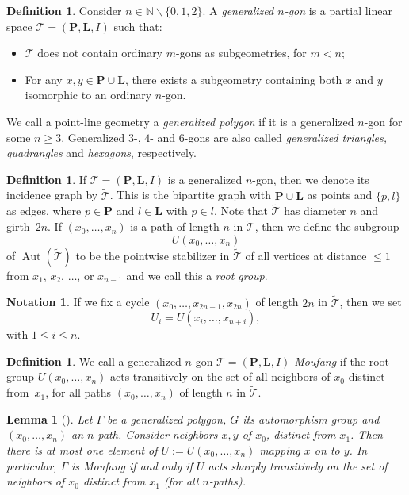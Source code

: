\documentclass[oneside,a4paper]{amsart} %
\newtheorem{lemma}[theorem]{Lemma}
\theoremstyle{definition}
\newtheorem{definition}[theorem]{Definition}
\newtheorem{notation}[theorem]{Notation}
\DeclareMathOperator{\Aut}{Aut}
\numberwithin{equation}{section}
\begin{document}
\begin{definition}
	Consider $n\in\mathbb N\backslash \{0,1,2\}$.
	A \textit{generalized $n$-gon} is a partial linear space $\mathcal T=(\mathbf P,\mathbf L,I)$ such that: 
	\begin{itemize}
		\item $\mathcal T$ does not contain ordinary $m$-gons as subgeometries, for $m<n$;
		\item For any $x,y\in\mathbf P\cup\mathbf L$, there exists a subgeometry containing both $x$ and $y$ isomorphic to an ordinary $n$-gon.
	\end{itemize}
	We call a point-line geometry a \textit{generalized polygon} if it is a generalized $n$-gon for some $n\geq 3$.
	Generalized $3$-, $4$- and $6$-gons are also called \textit{generalized triangles, quadrangles} and \textit{hexagons}, respectively.
\end{definition}

\begin{definition}
	If $\mathcal T=(\mathbf P,\mathbf L,I)$ is a generalized $n$-gon, then we denote its incidence graph by $\tilde{\mathcal T}$. 
	This is the bipartite graph with $\mathbf P\cup\mathbf L$ as points and $\{p,l\}$ as edges, where $p\in\mathbf P$ and $l\in\mathbf L$ with $p\in l$.
	Note that $\tilde{\mathcal T}$ has diameter $n$ and girth~$2n$.
	If $(x_0,\dots,x_n)$ is a path of length $n$ in $\tilde{\mathcal T}$, then we define the subgroup
		$$ U(x_0,\dots,x_n)$$
	of $\Aut(\tilde{\mathcal T})$ to be the pointwise stabilizer in $\tilde{\mathcal T}$ of all vertices at distance $\leq 1$ from $x_1$, $x_2$, $\dots$, or $x_{n-1}$ and we call this a \emph{root group}.
\end{definition}

\begin{notation}
\label{Notation root groups}
	If we fix a cycle $(x_0,\dots,x_{2n-1},x_{2n})$ of length $2n$ in $\tilde{\mathcal T}$, then we set 
	\[ U_i=U(x_{i},\dots,x_{n+i}),\]
	with $1\leq i\leq n$.
\end{notation}

\begin{definition}
	We call a generalized $n$-gon $\mathcal T=(\mathbf P,\mathbf L,I)$ \emph{Moufang} if the root group $U(x_0,\dots,x_n)$ acts transitively on the set of all neighbors of $x_0$ distinct from~$x_1$, for all paths $(x_0,\dots,x_n)$ of length $n$ in $\tilde{\mathcal T}$.
\end{definition}

\begin{lemma}[{\cite[(3.7)]{Tits2002}}]
\label{Moufang general remark}
	Let $\Gamma$ be a generalized polygon, $G$ its automorphism group and $(x_0,\ldots,x_n)$ an $n$-path. Consider neighbors $x,y$ of $x_0$, distinct from $x_{1}$. Then there is at most one element of $U:=U(x_0,\ldots,x_n)$ mapping $x$ on to $y$. In particular, $\Gamma$ is Moufang if and only if $U$ acts sharply transitively on the set of neighbors of $x_0$ distinct from $x_{1}$ (for all $n$-paths).
\end{lemma}
\end{document}
